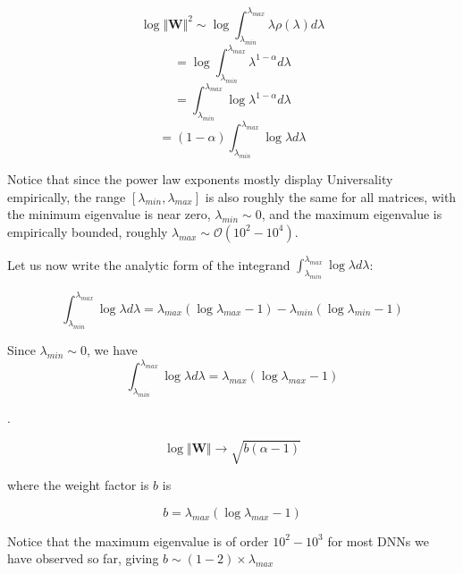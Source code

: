 $$\log\Vert\mathbf{W}\Vert^{2}\sim\log\int_{\lambda_{min}}^{\lambda_{max}}\lambda\rho(\lambda)d\lambda$$
$$=\log\int_{\lambda_{min}}^{\lambda_{max}}\lambda^{1-\alpha}d\lambda$$
$$=\int_{\lambda_{min}}^{\lambda_{max}}\log\lambda^{1-\alpha}d\lambda$$
$$=(1-\alpha)\int_{\lambda_{min}}^{\lambda_{max}}\log\lambda d\lambda$$

Notice that since the power law exponents mostly display Universality empirically, the range $[\lambda_{min},\lambda_{max}]$ is also roughly the same for all matrices, with the minimum eigenvalue is near zero, $\lambda_{min}\sim 0$, and the maximum eigenvalue is  empirically bounded, roughly $\lambda_{max}\sim\mathcal{O}(10^{2}-10^{4})$.  

Let us now write the analytic form of the integrand $\int_{\lambda_{min}}^{\lambda_{max}}\log\lambda d\lambda$:

$$\int_{\lambda_{min}}^{\lambda_{max}}\log\lambda d\lambda=\lambda_{max}(\log \lambda_{max} - 1)-\lambda_{min}(\log \lambda_{min} - 1)$$

Since $\lambda_{min}\sim 0$, we have
$$\int_{\lambda_{min}}^{\lambda_{max}}\log\lambda d\lambda=\lambda_{max}(\log \lambda_{max} - 1)$$






.  

$$\log\Vert\mathbf{W}\Vert\rightarrow \sqrt{b(\alpha-1)}$$

where the weight factor is $b$ is 

$$b=\lambda_{max}(\log \lambda_{max} - 1)$$

Notice that the maximum eigenvalue is of order $10^{2}-10^{3}$ for  most DNNs we have observed so far, giving $b\sim(1-2)\times\lambda_{max}$

